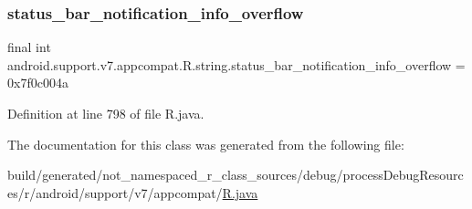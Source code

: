 \subsubsection{\texorpdfstring{status\_bar\_notification\_info\_overflow}{status\_bar\_notification\_info\_overflow}}
{\footnotesize\ttfamily final int android.\+support.\+v7.\+appcompat.\+R.\+string.\+status\+\_\+bar\+\_\+notification\+\_\+info\+\_\+overflow = 0x7f0c004a\hspace{0.3cm}{\ttfamily [static]}}



Definition at line 798 of file R.\+java.



The documentation for this class was generated from the following file\+:\begin{DoxyCompactItemize}
\item 
build/generated/not\+\_\+namespaced\+\_\+r\+\_\+class\+\_\+sources/debug/process\+Debug\+Resources/r/android/support/v7/appcompat/\mbox{\hyperlink{android_2support_2v7_2appcompat_2_r_8java}{R.\+java}}\end{DoxyCompactItemize}
